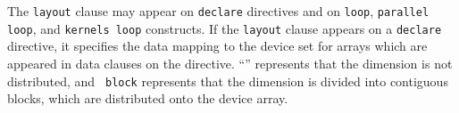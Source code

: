 







The {\tt layout} clause may appear on {\tt declare} directives and on
{\tt loop}, {\tt parallel loop}, and {\tt kernels loop} constructs.
If the {\tt layout} clause appears on a {\tt declare} directive, it
specifies the data mapping to the device set for arrays which are
appeared in data clauses on the directive.
``{\tt *}'' represents that the dimension is not distributed, and {\tt
block} represents that the dimension is divided into contiguous blocks,
which are distributed onto the device array.


